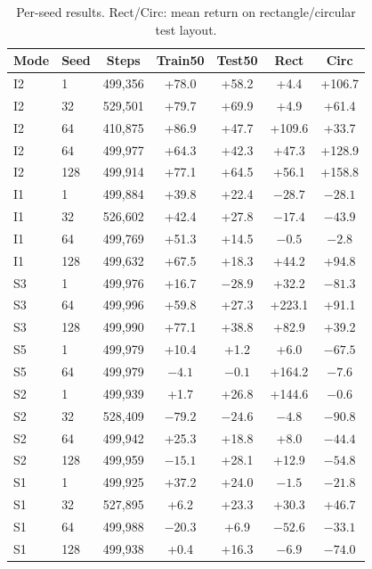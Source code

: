 \documentclass{article}
\begin{document}
\begin{table}[h]
  \centering\small
  \caption{Per-seed results. Rect/Circ: mean return on rectangle/circular test layout.}
  \label{tab:per_seed}
  \begin{tabular}{llccccc}
    \toprule
    \textbf{Mode} & \textbf{Seed} & \textbf{Steps} & \textbf{Train50} &
    \textbf{Test50} & \textbf{Rect} & \textbf{Circ} \\
    \midrule
    I2 & 1   & 499,356 & +78.0 & +58.2 & +4.4    & +106.7 \\
    I2 & 32  & 529,501 & +79.7 & +69.9 & +4.9    & +61.4  \\
    I2 & 64  & 410,875 & +86.9 & +47.7 & +109.6  & +33.7  \\
    I2 & 64  & 499,977 & +64.3 & +42.3 & +47.3   & +128.9 \\
    I2 & 128 & 499,914 & +77.1 & +64.5 & +56.1   & +158.8 \\
    \midrule
    I1 & 1   & 499,884 & +39.8 & +22.4 & $-28.7$ & $-28.1$ \\
    I1 & 32  & 526,602 & +42.4 & +27.8 & $-17.4$ & $-43.9$ \\
    I1 & 64  & 499,769 & +51.3 & +14.5 & $-0.5$  & $-2.8$  \\
    I1 & 128 & 499,632 & +67.5 & +18.3 & +44.2   & +94.8   \\
    \midrule
    S3 & 1   & 499,976 & +16.7 & $-28.9$ & +32.2   & $-81.3$ \\
    S3 & 64  & 499,996 & +59.8 & +27.3 & +223.1  & +91.1   \\
    S3 & 128 & 499,990 & +77.1 & +38.8 & +82.9   & +39.2   \\
    \midrule
    S5 & 1   & 499,979 & +10.4 & +1.2  & +6.0    & $-67.5$ \\
    S5 & 64  & 499,979 & $-4.1$& $-0.1$& +164.2  & $-7.6$  \\
    \midrule
    S2 & 1   & 499,939 & +1.7  & +26.8 & +144.6  & $-0.6$  \\
    S2 & 32  & 528,409 & $-79.2$& $-24.6$& $-4.8$ & $-90.8$ \\
    S2 & 64  & 499,942 & +25.3 & +18.8 & +8.0    & $-44.4$ \\
    S2 & 128 & 499,959 & $-15.1$& +28.1 & +12.9  & $-54.8$ \\
    \midrule
    S1 & 1   & 499,925 & +37.2 & +24.0 & $-1.5$  & $-21.8$ \\
    S1 & 32  & 527,895 & +6.2  & +23.3 & +30.3   & +46.7   \\
    S1 & 64  & 499,988 & $-20.3$& +6.9 & $-52.6$ & $-33.1$ \\
    S1 & 128 & 499,938 & +0.4  & +16.3 & $-6.9$  & $-74.0$ \\
    \bottomrule
  \end{tabular}
\end{table}
\end{document}
